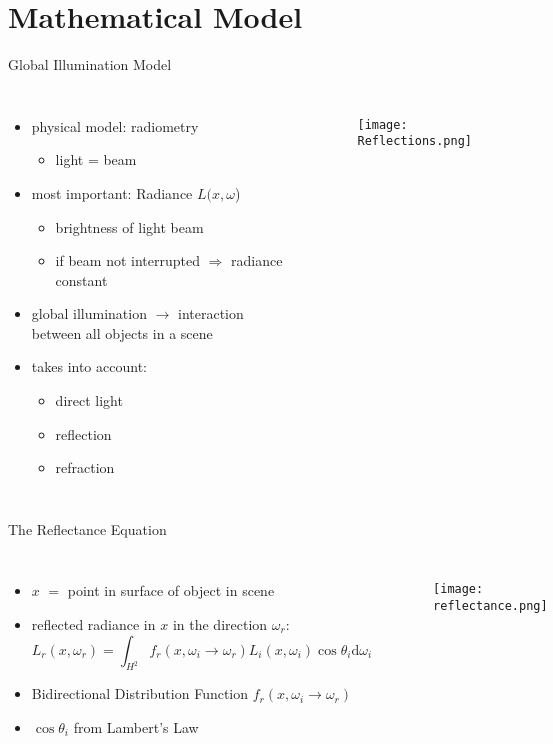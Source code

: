\section{Mathematical Model}
\begin{frame}{Global Illumination Model}

\begin{columns}
\begin{itemize}
\item<1-> physical model: radiometry 
\begin{itemize}
\item<1-> light = beam 
\end{itemize}
\item<2-> most important: Radiance $L(x, \omega$)
\begin{itemize}
    \item<2-> brightness of light beam
    \item<2-> if beam not interrupted $\Rightarrow$ radiance constant
\end{itemize}
\item<3-> global illumination $\rightarrow$ interaction between all objects in a scene 
\item<4-> takes into account:
\begin{itemize}
    \item<4-> direct light
    \item<4-> reflection
    \item<4-> refraction
\end{itemize}
\end{itemize}
\begin{figure}
\texttt{[image: Reflections.png]}
\end{figure}
\end{columns}

\end{frame}

\begin{frame}{The Reflectance Equation}
\begin{columns}
\begin{itemize}
    \item<1-> $x$ $=$ point in surface of object in scene
    \item<2-> reflected radiance in $x$ in the direction $\omega_r$: 
    \begin{equation}
L_r(x, \omega_r) = \int_{H^2} f_r(x, \omega_i \rightarrow \omega_r) L_i(x, \omega_i) \cos \theta_i \mathrm{d}\omega_i
\end{equation}
    \item<4-> Bidirectional Distribution Function $f_r(x, \omega_i \rightarrow \omega_r) $
    \item<5-> $\cos \theta_i$ from Lambert's Law
\end{itemize}
\begin{figure}
\texttt{[image: reflectance.png]}
\end{figure}
\end{columns}
\end{frame}

